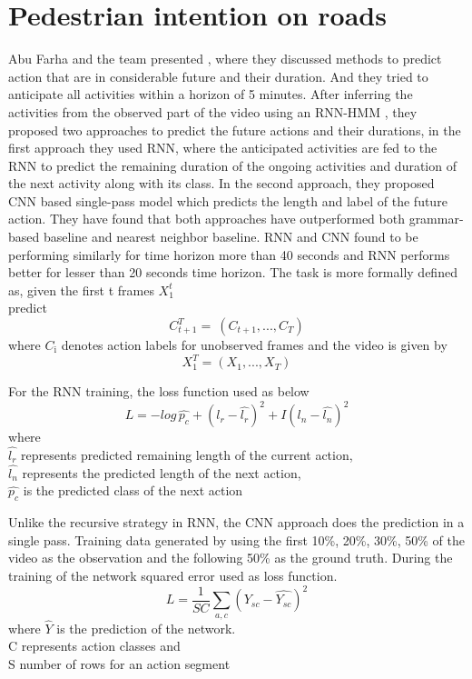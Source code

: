 \section{Pedestrian intention on roads}
\newpara Abu Farha and the team presented \cite{abu2018will}, where they discussed methods to predict action that are in considerable future and their duration. And they tried to anticipate all activities within a horizon of 5 minutes. After inferring the activities from the observed part of the video using an RNN-HMM \cite{richard2017weakly}, they proposed two approaches to predict the future actions and their durations, in the first approach they used RNN, where the anticipated activities are fed to the RNN to predict the remaining duration of the ongoing activities and duration of the next activity along with its class.
In the second approach, they proposed CNN based single-pass model which predicts the length and label of the future action. They have found that both approaches have outperformed both grammar-based baseline and nearest neighbor baseline. RNN and CNN found to be performing similarly for time horizon more than 40 seconds and RNN performs better for lesser than 20 seconds time horizon. The task is more formally defined as,
given the first t frames $X_{\text{1}}^t$ \\
predict \[ C_{t+1}^T  = \ (C_{t+1}, ..., C_{T}) \]
where $C_{\text{i}}$ denotes action labels for unobserved frames
and the video is given by
\[ X_{1}^T = (X_{1}, ..., X_{T}) \]

\newpara
For the RNN training, the loss function used as below
\begin{equation}
    L = -log\, \hat{p_c} + (l_r - \hat{l_r})^2 +  I (l_n - \hat{l_n})^2 
\end{equation}
where \\
$\hat{l_r}$ represents predicted remaining length of the current action, \\
$\hat{l_n}$ represents the predicted length of the next action, \\
$\hat{p_c}$ is the predicted class of the next action

\newpara Unlike the recursive strategy in RNN, the CNN approach does the prediction in a single pass.
Training data generated by using the first 10\%, 20\%, 30\%, 50\% of the video as the observation and the following 50\% as the ground truth. During the training of the network squared error used as loss function.
\begin{equation}
    L = \frac{1} {SC} \sum_{a,c} (Y_{sc} - \hat{Y_{sc}})^2 
\end{equation}
where $\hat{Y}$ is the prediction of the network. \\
C represents action classes and \\
S number of rows for an action segment

